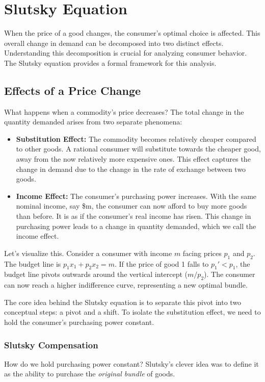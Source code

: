 \chapter{Slutsky Equation}\label{chap:slutsky}

When the price of a good changes, the consumer's optimal choice is affected. This overall change in demand can be decomposed into two distinct effects. Understanding this decomposition is crucial for analyzing consumer behavior. The Slutsky equation provides a formal framework for this analysis.

\section{Effects of a Price Change}
What happens when a commodity's price decreases? The total change in the quantity demanded arises from two separate phenomena:

\begin{itemize}
    \item \textbf{Substitution Effect:} The commodity becomes relatively cheaper compared to other goods. A rational consumer will substitute towards the cheaper good, away from the now relatively more expensive ones. This effect captures the change in demand due to the change in the rate of exchange between two goods.

    \item \textbf{Income Effect:} The consumer's purchasing power increases. With the same nominal income, say \$m, the consumer can now afford to buy more goods than before. It is as if the consumer's real income has risen. This change in purchasing power leads to a change in quantity demanded, which we call the income effect.
\end{itemize}

Let's visualize this. Consider a consumer with income \(m\) facing prices \(p_1\) and \(p_2\). The budget line is \(p_1 x_1 + p_2 x_2 = m\). If the price of good 1 falls to \(p_1' < p_1\), the budget line pivots outwards around the vertical intercept (\(m/p_2\)). The consumer can now reach a higher indifference curve, representing a new optimal bundle.

The core idea behind the Slutsky equation is to separate this pivot into two conceptual steps: a pivot and a shift. To isolate the substitution effect, we need to hold the consumer's purchasing power constant.

\subsection{Slutsky Compensation}
How do we hold purchasing power constant? Slutsky's clever idea was to define it as the ability to purchase the \textit{original bundle} of goods.

